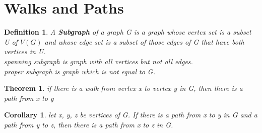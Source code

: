 \documentclass[10pt, a4paper]{article}
\newtheorem*{thm}{Theorem}
\newtheorem*{defn}{Definition}
\newtheorem*{corol}{Corollary}
\begin{document}
\section{Walks and Paths}
\begin{defn}
    A \textbf{Subgraph} of a graph G is a graph whose vertex set is a subset U of $V(G)$ and whose edge set is a subset of those edges of G that have both vertices in U.\\
    spanning subgraph is graph with all vertices but not all edges.\\
    proper subgraph is graph which is not equal to G.
\end{defn}
\begin{thm}
    if there is a walk from vertex x to vertex y in G, then there is a path from x to y
\end{thm}
\begin{corol}
    let x, y, z be vertices of G. If there is a path from x to y in G and a path from y to z, then there is a path from x to z in G. 
\end{corol}
\end{document}
